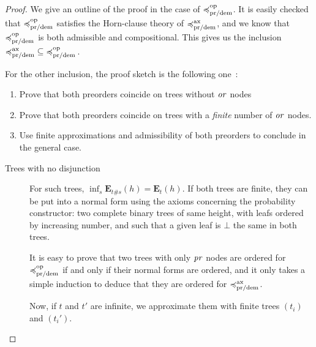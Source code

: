 \begin{proof}
    We give an outline of the proof in the case of $\preccurlyeq^{\text{op}}_{\text{pr/dem}}$.
    It is easily checked that $\preccurlyeq^{\text{op}}_{\text{pr/dem}}$ satisfies the Horn-clause
    theory of $\preccurlyeq^{\text{ax}}_{\text{pr/dem}}$, and we know that $\preccurlyeq^{\text{op}}_{\text{pr/dem}}$ is 
    both admissible and compositional. This gives us the inclusion 
    ${\preccurlyeq^{\text{ax}}_{\text{pr/dem}}} \subseteq {\preccurlyeq^{\text{op}}_{\text{pr/dem}}}\,$.
    
    For the other inclusion, the proof sketch is the following one~:
    \begin{enumerate}
        \item Prove that both preorders coincide 
            on trees without $\operatorname{\mathit{or}}$ nodes
        \item Prove that both preorders coincide 
            on trees with a \emph{finite} number 
            of $\operatorname{\mathit{or}}$ nodes.
        \item Use finite approximations and admissibility
            of both preorders to conclude in the general case.
    \end{enumerate}

    \begin{description}
        \item[Trees with no disjunction]


    For such trees, $\inf_s \mathbf{E}_{ t \# s } (h)
    = \mathbf{E}_{ t } (h)$.
    If both trees are finite, they can be put into 
    a normal form using the axioms concerning the 
    probability constructor: two complete binary trees 
    of same height,
    with leafs ordered by increasing number, and 
    such that a given leaf is $\bot$ the same 
    in both trees.

    It is easy to prove that two trees with 
    only $\operatorname{\mathit{pr}}$ nodes are ordered for $\preccurlyeq^{\text{op}}_{\text{pr/dem}}$
    if and only if their normal forms are ordered,
    and it only takes a simple induction to 
    deduce that they are ordered for $\preccurlyeq^{\text{ax}}_{\text{pr/dem}}$.

    Now, if $t$ and $t'$ are infinite, 
    we approximate them with finite trees $(t_i)$ and 
    $(t_i')$.
    

\end{description}
\end{proof}
